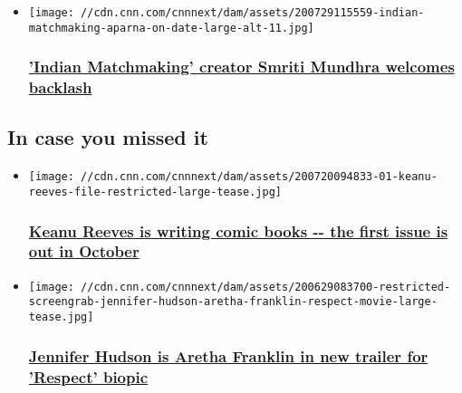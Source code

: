\begin{itemize}
\item
  \href{/2020/07/29/entertainment/smriti-mundhra-indian-matchmaking/index.html}{}

  \texttt{[image: //cdn.cnn.com/cnnnext/dam/assets/200729115559-indian-matchmaking-aparna-on-date-large-alt-11.jpg]}

  \hypertarget{indian-matchmaking-creator-smriti-mundhra-welcomes-backlash}{%
  \subsubsection{\texorpdfstring{\href{/2020/07/29/entertainment/smriti-mundhra-indian-matchmaking/index.html}{'Indian
  Matchmaking' creator Smriti Mundhra welcomes
  backlash}}{'Indian Matchmaking' creator Smriti Mundhra welcomes backlash}}\label{indian-matchmaking-creator-smriti-mundhra-welcomes-backlash}}
\end{itemize}

\hypertarget{in-case-you-missed-it-}{%
\subsection{In case you missed it~}\label{in-case-you-missed-it-}}

\begin{itemize}
\item
  \href{/2020/07/20/entertainment/keanu-reeves-comic-book-brzrkr-intl-scli/index.html}{}

  \texttt{[image: //cdn.cnn.com/cnnnext/dam/assets/200720094833-01-keanu-reeves-file-restricted-large-tease.jpg]}

  \hypertarget{keanu-reeves-is-writing-comic-books----the-first-issue-is-out-in-october-}{%
  \subsubsection{\texorpdfstring{\href{/2020/07/20/entertainment/keanu-reeves-comic-book-brzrkr-intl-scli/index.html}{Keanu
  Reeves is writing comic books -\/- the first issue is out in October
  }}{Keanu Reeves is writing comic books -\/- the first issue is out in October }}\label{keanu-reeves-is-writing-comic-books----the-first-issue-is-out-in-october-}}
\item
  \href{/2020/06/29/entertainment/jennifer-hudson-aretha-franklin-trnd/index.html}{}

  \texttt{[image: //cdn.cnn.com/cnnnext/dam/assets/200629083700-restricted-screengrab-jennifer-hudson-aretha-franklin-respect-movie-large-tease.jpg]}

  \hypertarget{jennifer-hudson-is-aretha-franklin-in-new-trailer-for-respect-biopic}{%
  \subsubsection{\texorpdfstring{\href{/2020/06/29/entertainment/jennifer-hudson-aretha-franklin-trnd/index.html}{Jennifer
  Hudson is Aretha Franklin in new trailer for 'Respect'
  biopic}}{Jennifer Hudson is Aretha Franklin in new trailer for 'Respect' biopic}}\label{jennifer-hudson-is-aretha-franklin-in-new-trailer-for-respect-biopic}}
\end{itemize}

